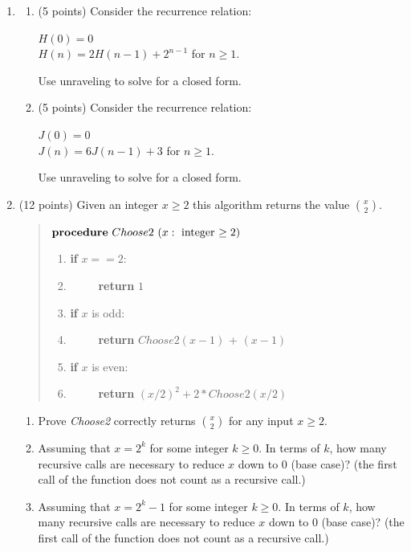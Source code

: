 \documentclass[10pt,letterpaper,unboxed,cm]{article}
\begin{document}
\begin{enumerate}
\item 
\begin{enumerate}
\item(5 points)
Consider the recurrence relation:

$H(0) = 0$\\
$H(n) = 2H(n-1) + 2^{n-1}$ for $n\geq 1$.

Use unraveling to solve for a closed form.

\item(5 points)
Consider the recurrence relation:

$J(0) = 0$\\
$J(n) = 6J(n-1) + 3$ for $n\geq 1$.

Use unraveling to solve for a closed form.

\end{enumerate}

\item (12 points)
Given an integer $x\geq 2$ this algorithm returns the value ${x \choose 2}$.

\begin{quote}
	$\mbox{\bf procedure} ~Choose2~(x : \mbox{ integer $\geq 2$} )$
	\begin{enumerate}[1.~~~~~~]
		\item {\bf if} $x == 2$:
		\item ~~~~~{\bf return} $1$
		\item {\bf if} $x$ is odd:
		\item ~~~~~{\bf return} $Choose2(x-1)$ + $(x-1)$
		\item {\bf if} $x$ is even:
		\item ~~~~~{\bf return} $(x/2)^2 + 2*Choose2(x/2)$
		
	\end{enumerate} 
\end{quote}

\begin{enumerate}[(a.)]
\item
Prove \emph{Choose2} correctly returns ${x\choose 2}$ for any input $x\geq 2$.

	\item Assuming that $x = 2^k$ for some integer $k\geq 0$. In terms of $k$, how many recursive calls are necessary to reduce $x$ down to 0 (base case)? (the first call of the function does not count as a recursive call.)
	

	\item Assuming that $x = 2^k - 1$ for some integer $k\geq 0$. In terms of $k$, how many recursive calls are necessary to reduce $x$ down to 0 (base case)? (the first call of the function does not count as a recursive call.) 
	

\end{enumerate}
\end{enumerate}
\end{document}

